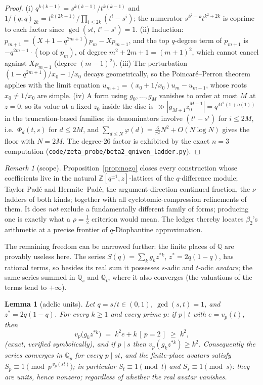 \documentclass[11pt]{article}
\theoremstyle{plain}
\newtheorem{lemma}[theorem]{Lemma}
\theoremstyle{definition}
\theoremstyle{remark}
\newtheorem{remark}[theorem]{Remark}
\newcommand{\Z}{\mathbb{Z}}
\newcommand{\Q}{\mathbb{Q}}
\begin{document}
\begin{proof}
(i) $q^{k(k-1)}=s^{k(k-1)}/t^{k(k-1)}$ and $1/(q;q)_{2k}=t^{k(2k+1)}/\prod_{i\le2k}(t^i-s^i)$; the
numerator $s^{k^2-k}t^{k^2+2k}$ is coprime to each factor since
$\gcd(st,\,t^i-s^i)=1$. (ii) Induction: $p_{m+1}=(X+1-q^{2m+1})p_m-Xp_{m-1}$, and the top
$q$-degree term of $p_{m+1}$ is $-q^{2m+1}\cdot(\text{top of }p_m)$, of degree $m^2+2m+1=(m+1)^2$,
which cannot cancel against $Xp_{m-1}$ (degree $(m-1)^2$). (iii) The perturbation
$(1-q^{2m+1})/x_0-1/x_0$ decays geometrically, so the Poincar\'e--Perron theorem \cite{Poincare1885,Perron1909} applies with the
limit equation $u_{m+1}=(x_0+1/x_0)u_m-u_{m-1}$, whose roots $x_0\ne1/x_0$ are simple. (iv) A form
using $g_0,\dots,g_M$ vanishes to order at most $M$ at $z=0$, so its value at a fixed $z_0$ inside
the disc is $\gg|g_{M+1}z_0^{M+1}|=q^{M^2(1+o(1))}$ in the truncation-based families; its
denominators involve $(t^i-s^i)$ for $i\le2M$, i.e.\ $\Phi_d(t,s)$ for $d\le2M$, and
$\sum_{d\le N}\varphi(d)=\tfrac3{\pi^2}N^2+O(N\log N)$ gives the floor with $N=2M$. The degree-$26$
factor is exhibited by the exact $n=3$ computation
(\texttt{code/zeta\_probe/beta2\_qniven\_ladder.py}).
\end{proof}

\begin{remark}[scope]
\label{rem:nogo-scope}
Proposition~\ref{prop:nogo} closes every construction whose coefficients live in the natural
$\Z[q^{\pm1},z]$-lattices of the $q$-difference module; Taylor Pad\'e and Hermite--Pad\'e,
the argument-direction continued fraction, the $\nu$-ladders of both kinds; together with all
cyclotomic-compression refinements of them. It does \emph{not} exclude a fundamentally different
family of forms; producing one is exactly what a $\rho=\tfrac12$ criterion would mean. The ledger
thereby locates $\beta_2$'s arithmetic at a precise frontier of $q$-Diophantine approximation.
\end{remark}

The remaining freedom can be narrowed further: the finite places of $\Q$ are provably useless here.
The series $S(q)=\sum_k g_k z^{\ast k}$, $z^\ast=2q(1-q)$, has rational terms, so besides its real sum
it possesses $s$-adic and $t$-adic \emph{avatars}; the same series summed in $\Q_s$ and $\Q_t$,
where it also converges (the valuations of the terms tend to $+\infty$).

\begin{lemma}[adelic units]
\label{lem:adelic-units}
Let $q=s/t\in(0,1)$, $\gcd(s,t)=1$, and $z^\ast=2q(1-q)$. For every $k\ge1$ and every prime $p$:
if $p\mid t$ with $e=v_p(t)$, then
\[
   v_p\bigl(g_kz^{\ast k}\bigr)\;=\;k^2e+k\,[\,p=2\,]\;\ge\;k^2 ,
\]
(exact, verified symbolically), and if $p\mid s$ then $v_p(g_kz^{\ast k})\ge k^2$. Consequently the
series converges in $\Q_p$ for every $p\mid st$, and the finite-place avatars satisfy
$S_p\equiv1\pmod{p^{\,v_p(st)}}$; in particular $S_t\equiv1\pmod t$ and $S_s\equiv1\pmod s$: they
are \emph{units}, hence nonzero; regardless of whether the real avatar vanishes.
\end{lemma}
\end{document}
